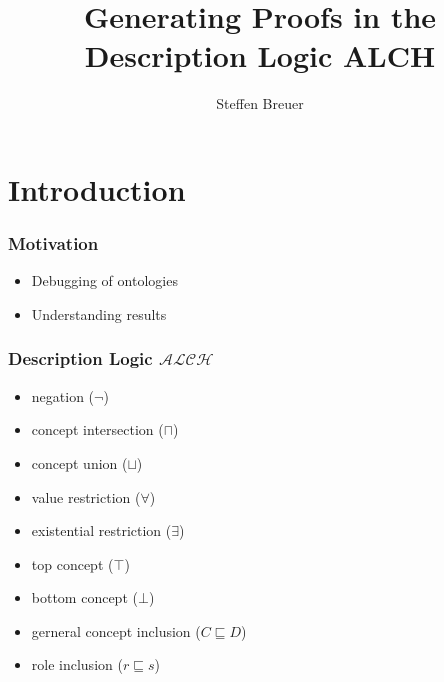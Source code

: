 \documentclass{beamer}
\title{Generating Proofs in the Description Logic ALCH}
\author{Steffen Breuer}
\institute[Automata Theory]{TU Dresden}
\begin{document}
\maketitle


\section{Introduction}
\begin{frame}
\frametitle{Motivation}
    \begin{itemize}
        \item Debugging of ontologies
        \item Understanding results
    \end{itemize}
\end{frame}

\begin{frame}
\frametitle{Description Logic $\mathcal{ALCH}$}    
\begin{itemize}
        \item negation ($\neg$)
        \item concept intersection ($\sqcap$)
        \item concept union ($\sqcup$)
        \item value restriction ($\forall$)
        \item existential restriction ($\exists$)
        \item top concept ($\top$)
        \item bottom concept ($\bot$)
        \item gerneral concept inclusion ($C \sqsubseteq D$)
        \item role inclusion ($ r \sqsubseteq s$)
    \end{itemize}
\end{frame}
\end{document}
